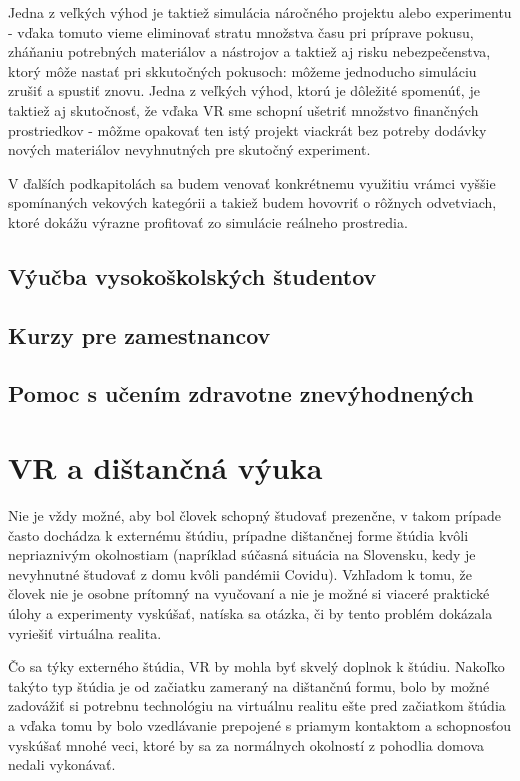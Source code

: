 \documentclass[10pt,twoside,slovak,a4paper]{article}
\begin{document}
Jedna z veľkých výhod je taktiež simulácia náročného projektu alebo experimentu  - vďaka tomuto vieme eliminovať stratu množstva času pri príprave pokusu, zháňaniu potrebných materiálov a nástrojov a taktiež aj risku nebezpečenstva, ktorý môže nastať pri skkutočných pokusoch: môžeme jednoducho simuláciu zrušiť a spustiť znovu. Jedna z veľkých výhod, ktorú je dôležité spomenúť, je taktiež aj skutočnosť, že vďaka VR sme schopní ušetriť množstvo finančných prostriedkov - môžme opakovať ten istý projekt viackrát bez potreby dodávky nových materiálov nevyhnutných pre skutočný experiment.

 V ďalších podkapitolách sa budem venovať konkrétnemu využitiu vrámci vyššie spomínaných vekových kategórii a takiež budem hovovriť o rôžnych odvetviach, ktoré dokážu výrazne profitovať zo simulácie reálneho prostredia.

\subsection{Výučba vysokoškolských študentov} \label{studenti}

\subsection{Kurzy pre zamestnancov} \label{zamestnanci}

\subsection{Pomoc s učením zdravotne znevýhodnených} \label{pomoc}

\section{VR a dištančná výuka} \label{stvrta}

Nie je vždy možné, aby bol človek schopný študovať prezenčne, v takom prípade často dochádza k externému štúdiu, prípadne dištančnej forme štúdia kvôli nepriaznivým okolnostiam (napríklad súčasná situácia na Slovensku, kedy je nevyhnutné študovať z domu kvôli pandémii Covidu). Vzhľadom k tomu, že človek nie je osobne prítomný na vyučovaní a nie je možné si viaceré praktické úlohy a experimenty vyskúšať, natíska sa otázka, či by tento problém dokázala vyriešiť virtuálna realita.

Čo sa týky externého štúdia, VR by mohla byť skvelý doplnok k štúdiu. Nakoľko takýto typ štúdia je od začiatku zameraný na dištančnú formu, bolo by možné zadovážiť si potrebnu technológiu na virtuálnu realitu ešte pred začiatkom štúdia a vďaka tomu by bolo vzedlávanie prepojené s priamym kontaktom a schopnosťou vyskúšať mnohé veci, ktoré by sa za normálnych okolností z pohodlia domova nedali vykonávať.
\end{document}
